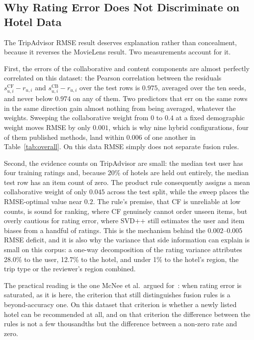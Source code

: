 \documentclass[runningheads]{llncs}
\begin{document}
\subsection{Why Rating Error Does Not Discriminate on Hotel Data}
\label{sec:discussion}

The TripAdvisor RMSE result deserves explanation rather than concealment, because it reverses the MovieLens result. Two measurements account for it.

First, the errors of the collaborative and content components are almost perfectly correlated on this dataset: the Pearson correlation between the residuals $s^{\mathrm{CF}}_{u,i} - r_{u,i}$ and $s^{\mathrm{CB}}_{u,i} - r_{u,i}$ over the test rows is $0.975$, averaged over the ten seeds, and never below $0.974$ on any of them. Two predictors that err on the same rows in the same direction gain almost nothing from being averaged, whatever the weights. Sweeping the collaborative weight from $0$ to $0.4$ at a fixed demographic weight moves RMSE by only $0.001$, which is why nine hybrid configurations, four of them published methods, land within $0.006$ of one another in Table~\ref{tab:overall}. On this data RMSE simply does not separate fusion rules.

Second, the evidence counts on TripAdvisor are small: the median test user has four training ratings and, because 20\% of hotels are held out entirely, the median test row has an item count of zero. The product rule consequently assigns a mean collaborative weight of only $0.045$ across the test split, while the sweep places the RMSE-optimal value near $0.2$. The rule's premise, that CF is unreliable at low counts, is sound for ranking, where CF genuinely cannot order unseen items, but overly cautious for rating error, where SVD++ still estimates the user and item biases from a handful of ratings. This is the mechanism behind the $0.002$--$0.005$ RMSE deficit, and it is also why the variance that side information can explain is small on this corpus: a one-way decomposition of the rating variance attributes 28.0\% to the user, 12.7\% to the hotel, and under 1\% to the hotel's region, the trip type or the reviewer's region combined.

The practical reading is the one McNee et al.\ argued for~\cite{mcnee2006}: when rating error is saturated, as it is here, the criterion that still distinguishes fusion rules is a beyond-accuracy one. On this dataset that criterion is whether a newly listed hotel can be recommended at all, and on that criterion the difference between the rules is not a few thousandths but the difference between a non-zero rate and zero.
\end{document}
